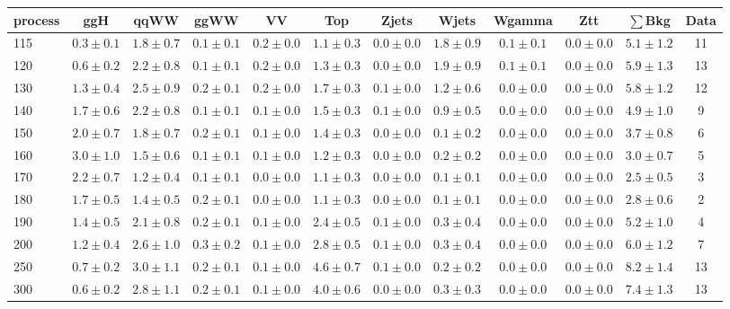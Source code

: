 \begin{table}[!hb]
{\footnotesize
 \begin{center}
 \begin{tabular}{l c c c c c c c c c c c }
 \hline
 process & ggH & qqWW & ggWW & VV & Top & Zjets & Wjets & Wgamma & Ztt & $\sum$Bkg & Data \\
 \hline
115 & $0.3\pm0.1$ & $1.8\pm0.7$ & $0.1\pm0.1$ & $0.2\pm0.0$ & $1.1\pm0.3$ & $0.0\pm0.0$ & $1.8\pm0.9$ & $0.1\pm0.1$ & $0.0\pm0.0$ & $5.1\pm1.2$ & 11 \\
120 & $0.6\pm0.2$ & $2.2\pm0.8$ & $0.1\pm0.1$ & $0.2\pm0.0$ & $1.3\pm0.3$ & $0.0\pm0.0$ & $1.9\pm0.9$ & $0.1\pm0.1$ & $0.0\pm0.0$ & $5.9\pm1.3$ & 13 \\
130 & $1.3\pm0.4$ & $2.5\pm0.9$ & $0.2\pm0.1$ & $0.2\pm0.0$ & $1.7\pm0.3$ & $0.1\pm0.0$ & $1.2\pm0.6$ & $0.0\pm0.0$ & $0.0\pm0.0$ & $5.8\pm1.2$ & 12 \\
140 & $1.7\pm0.6$ & $2.2\pm0.8$ & $0.1\pm0.1$ & $0.1\pm0.0$ & $1.5\pm0.3$ & $0.1\pm0.0$ & $0.9\pm0.5$ & $0.0\pm0.0$ & $0.0\pm0.0$ & $4.9\pm1.0$ & 9 \\
150 & $2.0\pm0.7$ & $1.8\pm0.7$ & $0.2\pm0.1$ & $0.1\pm0.0$ & $1.4\pm0.3$ & $0.0\pm0.0$ & $0.1\pm0.2$ & $0.0\pm0.0$ & $0.0\pm0.0$ & $3.7\pm0.8$ & 6 \\
160 & $3.0\pm1.0$ & $1.5\pm0.6$ & $0.1\pm0.1$ & $0.1\pm0.0$ & $1.2\pm0.3$ & $0.0\pm0.0$ & $0.2\pm0.2$ & $0.0\pm0.0$ & $0.0\pm0.0$ & $3.0\pm0.7$ & 5 \\
170 & $2.2\pm0.7$ & $1.2\pm0.4$ & $0.1\pm0.1$ & $0.0\pm0.0$ & $1.1\pm0.3$ & $0.0\pm0.0$ & $0.1\pm0.1$ & $0.0\pm0.0$ & $0.0\pm0.0$ & $2.5\pm0.5$ & 3 \\
180 & $1.7\pm0.5$ & $1.4\pm0.5$ & $0.2\pm0.1$ & $0.0\pm0.0$ & $1.1\pm0.3$ & $0.0\pm0.0$ & $0.1\pm0.1$ & $0.0\pm0.0$ & $0.0\pm0.0$ & $2.8\pm0.6$ & 2 \\
190 & $1.4\pm0.5$ & $2.1\pm0.8$ & $0.2\pm0.1$ & $0.1\pm0.0$ & $2.4\pm0.5$ & $0.1\pm0.0$ & $0.3\pm0.4$ & $0.0\pm0.0$ & $0.0\pm0.0$ & $5.2\pm1.0$ & 4 \\
200 & $1.2\pm0.4$ & $2.6\pm1.0$ & $0.3\pm0.2$ & $0.1\pm0.0$ & $2.8\pm0.5$ & $0.1\pm0.0$ & $0.3\pm0.4$ & $0.0\pm0.0$ & $0.0\pm0.0$ & $6.0\pm1.2$ & 7 \\
250 & $0.7\pm0.2$ & $3.0\pm1.1$ & $0.2\pm0.1$ & $0.1\pm0.0$ & $4.6\pm0.7$ & $0.1\pm0.0$ & $0.2\pm0.2$ & $0.0\pm0.0$ & $0.0\pm0.0$ & $8.2\pm1.4$ & 13 \\
300 & $0.6\pm0.2$ & $2.8\pm1.1$ & $0.2\pm0.1$ & $0.1\pm0.0$ & $4.0\pm0.6$ & $0.0\pm0.0$ & $0.3\pm0.3$ & $0.0\pm0.0$ & $0.0\pm0.0$ & $7.4\pm1.3$ & 13 \\

\end{tabular}
\end{center}}
\end{table}
